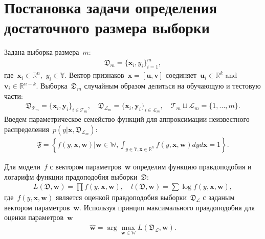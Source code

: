 \section{Постановка задачи определения достаточного размера выборки}

Задана выборка размера~$m$:
\[
\label{eq:ps:1}
\begin{aligned}
	\mathfrak{D}_{m} = \{\textbf{x}_i, y_i\}_{i = 1}^{m},
\end{aligned}
\]
где~$\textbf{x}_i\in \mathbb{R}^{n}$,~$y_i\in \mathbb{Y}$. Вектор признаков~$\textbf{x} = [\textbf{u}, \textbf{v}]$ соединяет~$\textbf{u}_i\in \mathbb{R}^{k}$ and~$ \textbf{v}_i\in \mathbb{R}^{n-k}$.
Выборка~$\mathfrak{D}_{m}$ случайным образом делиться на обучающую и тестовую части:
\[
\label{eq:ps:2}
\begin{aligned}
	\mathfrak{D}_{\mathcal{T}_{m}} = \{\textbf{x}_i, \textbf{y}_i\}_{i \in \mathcal{T}_{m}}, \quad \mathfrak{D}_{\mathcal{L}_{m}} = \{\textbf{x}_i, \textbf{y}_i\}_{i \in \mathcal{L}_{m}}, \quad  \mathcal{T}_{m}\sqcup\mathcal{L}_{m} = \{1, ..., m\}.
\end{aligned}
\]
Введем параметрическое семейство функций для аппроксимации неизвестного распределения~$p(y|\textbf{x}, \mathfrak{D}_{\mathcal{L}_{m}})$:
\[
\label{eq:ps:3}
\begin{aligned}
	\mathfrak{F} = \left\{f\left(y,\textbf{x}, \textbf{w}\right)|\textbf{w}\in\mathbb{W}, \int_{y\in \mathbb{Y}, \textbf{x}\in\mathbb{R}^{n}}f\left(y, \textbf{x}, \textbf{w}\right)dyd\textbf{x}=1\right\}.
\end{aligned}
\]

Для модели~$f$ с вектором параметров~$\textbf{w}$ определим функцию правдоподобия и логарифм функции прадоподобия выборки~$\mathfrak{D}$:
\[
\label{eq:ps:4}
\begin{aligned}
	L\left(\mathfrak{D}, \textbf{w}\right) = \prod f\left(y,\textbf{x}, \textbf{w}\right),\quad l\left(\mathfrak{D}, \textbf{w}\right) = \sum \log f\left(y,\textbf{x}, \textbf{w}\right),
\end{aligned}
\]
где~$f(y,\textbf{x}, \textbf{w})$ является оценкой правдоподобия выборки~$\mathfrak{D}_{\mathcal{L}}$ с заданым вектором параметров~$\textbf{w}$.
Используя принцип максимального правдоподобия для оценки параметров~$\textbf{w}$
\[
\label{eq:ps:5}
\begin{aligned}
	\hat{\textbf{w}} = \arg\max_{\textbf{w}\in\mathbb{W}}L\left(\mathfrak{D}_{\mathcal{L}}, \textbf{w}\right).
\end{aligned}
\]

